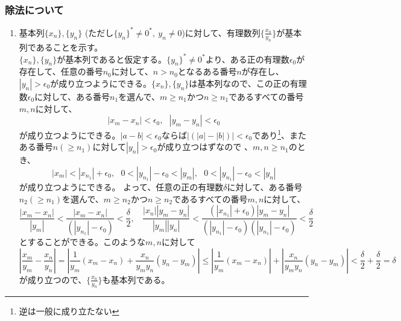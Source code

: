 \documentclass{jsarticle}
\begin{document}
\subsubsection{除法について}
\begin{enumerate}
\item
基本列$\{x_n\},\{y_n\}$ (ただし$\{y_n\}^*\neq 0^*,\ y_n\neq 0$)に対して、有理数列$\{\frac{x_n}{y_n}\}$が基本列であることを示す。\\
$\{x_n\},\{y_n\}$が基本列であると仮定する。$\{y_n\}^*\neq 0^*$より、ある正の有理数$\epsilon_0$が存在して、任意の番号$n_0$に対して、$n>n_0$となるある番号$n$が存在し、$|y_n|>\epsilon_0$が成り立つようにできる。$\{x_n\},\{y_n\}$は基本列なので、この正の有理数$\epsilon_0$に対して、ある番号$n_1$を選んで、$m\geq n_1$かつ$n\geq n_1$であるすべての番号$m,n$に対して、
\[|x_m-x_n|<\epsilon_0,\ \ \ |y_m-y_n|<\epsilon_0\]
が成り立つようにできる。$|a-b|<\epsilon_0$ならば$|(|a|-|b|)|<\epsilon_0$であり\footnote{逆は一般に成り立たない}、またある番号$n(\geq n_1)$に対して$|y_n|>\epsilon_0$が成り立つはずなので 、$m,n\geq n_1$のとき、
\[ |x_m|<|x_{n_1}|+\epsilon_0,\ \ \    0<|y_{n_1}|-\epsilon_0<|y_m|,\ \ \    0<|y_{n_1}|-\epsilon_0<|y_n|\]
が成り立つようにできる。
よって、任意の正の有理数$\delta$に対して、ある番号$n_2(\geq n_1)$を選んで、$m\geq n_2$かつ$n\geq n_2$であるすべての番号$m,n$に対して、
\[\frac{|x_m -x_n|}{|y_m|} < \frac{|x_m-x_n|}{(|y_{n_1}|-\epsilon_0)} <\frac{\delta}{2},\ \ \ \  
\frac{|x_n||y_m-y_n|}{|y_m||y_n|}<\frac{(|x_{n_1}|+\epsilon_0)|y_m-y_n|}{(|y_{n_1}|-\epsilon_0)(|y_{n_1}|-\epsilon_0)}<\frac{\delta}{2}\]
とすることができる。このような$m,n$に対して
\[|\frac{x_m}{y_m}-\frac{x_n}{y_n}|=|\frac{1}{y_m}(x_m-x_n)+\frac{x_n}{y_m y_n}(y_n-y_m)|\leq|\frac{1}{y_m}(x_m-x_n)|+|\frac{x_n}{y_m y_n}(y_n-y_m)|< \frac{\delta}{2}+\frac{\delta}{2}=\delta\]
が成り立つので、$\{\frac{x_n}{y_n}\}$も基本列である。


\end{enumerate}
\end{document}

